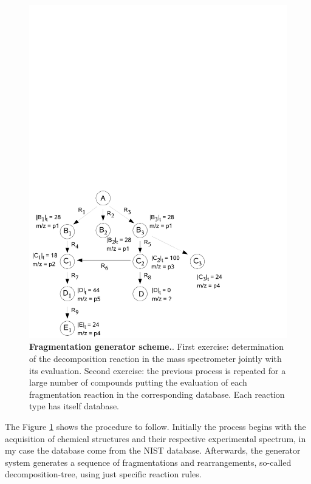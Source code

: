 \documentclass[10pt]{bmc_article}
\newenvironment{bmcformat}{\begin{raggedright}\baselineskip20pt\sloppy\setboolean{publ}{false}}{\end{raggedright}\baselineskip20pt\sloppy}
\begin{document}
\begin{bmcformat}
\begin{figure}[htp]
\begin{center}
\includegraphics[scale=1.05]{figures/fragmentationGenerator2.pdf} 
\caption[Fragmentation generator scheme.]{{\bf{Fragmentation generator 
scheme.}}. First exercise: determination of the decomposition reaction in the 
mass spectrometer jointly with its evaluation. Second exercise: the previous 
process is repeated for a large number of compounds putting the evaluation of 
each fragmentation reaction in the corresponding database. Each reaction type 
has itself database.}
\end{center}
\label{fig:fragmenatationGenerator1}
\end{figure}

The Figure \ref{fig:fragmenatationGenerator1} shows the procedure to follow. 
Initially the process begins with the acquisition of chemical structures and 
their respective experimental spectrum, in my case the database come from the 
NIST database. Afterwards, the generator system generates a sequence of 
fragmentations and rearrangements, so-called decomposition-tree, using just 
specific reaction rules.


\end{bmcformat}
\end{document}
